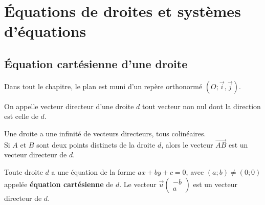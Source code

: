 


\chapter{Équations de droites et systèmes d'équations}



\section{Équation cartésienne d'une droite}
Dans tout le chapitre, le plan est muni d'un repère orthonormé $(O;\overrightarrow{i},\overrightarrow{j})$.

\begin{Définition}
On appelle vecteur directeur d'une droite $d$ tout vecteur non nul dont la direction est celle de $d$.

\end{Définition}

\begin{Remarque}
Une droite a une infinité de vecteurs directeurs, tous colinéaires.\\
Si $A$ et $B$ sont deux points distincts de la droite $d$, alors le vecteur $\overrightarrow{AB}$ est un vecteur directeur de $d$.
\end{Remarque}

\begin{Propriété}

Toute droite $d$ a une équation de la forme $ax+by+c=0$, avec $(a;b)\neq(0;0)$ appelée {\bf{équation cartésienne}} de $d$.
Le vecteur $\overrightarrow{u}\begin{pmatrix}
-b \\
a
\end{pmatrix}$ est un vecteur directeur de $d$.


\end{Propriété}

